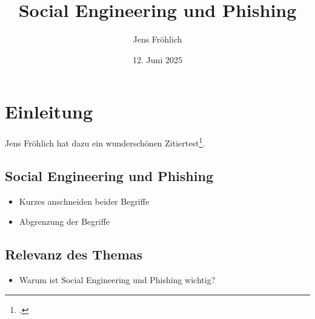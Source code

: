 \documentclass[12pt, a4paper, oneside]{scrartcl}
\title{Social Engineering und Phishing}
\author{Jens Fröhlich}
\date{12. Juni 2025}
\begin{document}

\begin{titlepage}
    \thispagestyle{empty}
    \maketitle
    \vspace{2cm}
    \begin{center}
    \end{center}
\end{titlepage}


\clearpage
\pagestyle{empty}
\tableofcontents


\justify


\pagestyle{scrheadings}
\clearpairofpagestyles

\ihead{}
\chead{}
\ohead{}

\ifoot{}
\cfoot[\pagemark]{\pagemark}
\ofoot{}

\setcounter{page}{2}

\section{Einleitung}
Jens Fröhlich hat dazu ein wunderschönen Zitiertest\footcite{JensTest}.

\subsection{Social Engineering und Phishing}
\begin{itemize}
  \item Kurzes anschneiden beider Begriffe
  \item Abgrenzung der Begriffe
\end{itemize}

\subsection{Relevanz des Themas}
\begin{itemize}
  \item Warum ist Social Engineering und Phishing wichtig?
\end{itemize}
\end{document}
